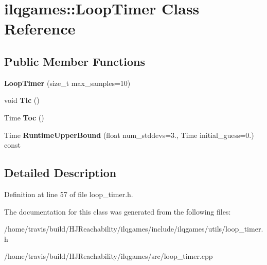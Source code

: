 \hypertarget{classilqgames_1_1_loop_timer}{}\section{ilqgames\+:\+:Loop\+Timer Class Reference}
\label{classilqgames_1_1_loop_timer}
\subsection*{Public Member Functions}
\begin{DoxyCompactItemize}
\item 
{\bfseries Loop\+Timer} (size\+\_\+t max\+\_\+samples=10)\hypertarget{classilqgames_1_1_loop_timer_adf0fca5ddad39e3939fc178b698b3e4d}{}\label{classilqgames_1_1_loop_timer_adf0fca5ddad39e3939fc178b698b3e4d}

\item 
void {\bfseries Tic} ()\hypertarget{classilqgames_1_1_loop_timer_aa4bdb7d7b8550356ffd177890c11c8ef}{}\label{classilqgames_1_1_loop_timer_aa4bdb7d7b8550356ffd177890c11c8ef}

\item 
Time {\bfseries Toc} ()\hypertarget{classilqgames_1_1_loop_timer_a9361224acb6b77b1e6546f3e76625fe2}{}\label{classilqgames_1_1_loop_timer_a9361224acb6b77b1e6546f3e76625fe2}

\item 
Time {\bfseries Runtime\+Upper\+Bound} (float num\+\_\+stddevs=3., Time initial\+\_\+guess=0.) const \hypertarget{classilqgames_1_1_loop_timer_a551691bad650b5c70efbeb08b355638f}{}\label{classilqgames_1_1_loop_timer_a551691bad650b5c70efbeb08b355638f}

\end{DoxyCompactItemize}


\subsection{Detailed Description}


Definition at line 57 of file loop\+\_\+timer.\+h.



The documentation for this class was generated from the following files\+:\begin{DoxyCompactItemize}
\item 
/home/travis/build/\+H\+J\+Reachability/ilqgames/include/ilqgames/utils/loop\+\_\+timer.\+h\item 
/home/travis/build/\+H\+J\+Reachability/ilqgames/src/loop\+\_\+timer.\+cpp\end{DoxyCompactItemize}
